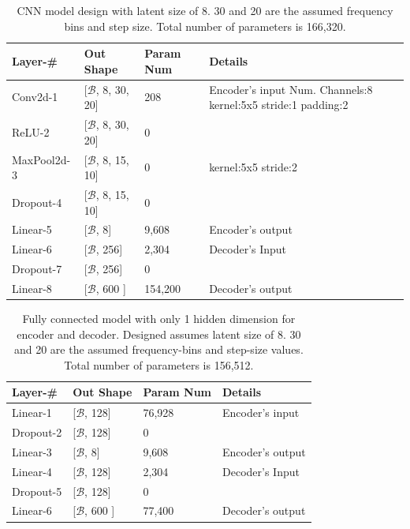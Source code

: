 \documentclass[\main/thesis.tex]{subfiles}
\begin{document}
\begin{table}[h]
\begin{tabular}{|p{28mm}|p{25mm}|p{23mm}|p{50mm}|}
\hline
Layer-\# & Out Shape & Param Num & Details  \\ \hline
Conv2d-1 & [$\mathcal{B}$, 8, 30, 20] &   208 & Encoder's input \newline
Num. Channels:8\newline
kernel:5x5\newline                  
stride:1\newline    
padding:2 \\ \hline
ReLU-2 & [$\mathcal{B}$, 8, 30, 20] &   0 & \\  \hline
MaxPool2d-3 & [$\mathcal{B}$, 8, 15, 10] & 0 &  kernel:5x5 \newline
stride:2 \\ \hline
Dropout-4 & [$\mathcal{B}$, 8, 15, 10] & 0 &  \\ \hline
Linear-5 & [$\mathcal{B}$, 8] & 9,608 & Encoder's output \\ \hline
Linear-6 & [$\mathcal{B}$, 256] & 2,304 & Decoder's Input \\ \hline
Dropout-7 & [$\mathcal{B}$, 256] & 0 &  \\ \hline
Linear-8 & [$\mathcal{B}$, 600 ] &  154,200& Decoder's output\\ \hline
\end{tabular}
\caption{CNN model design with latent size of 8. 30 and 20 are the assumed frequency bins and step size. Total number of parameters is 166,320. }
\label{table:CNNAUTOENCODER}
\end{table}

\begin{table}[h]
\begin{tabular}{|p{28mm}|p{25mm}|p{23mm}|p{50mm}|}
\hline
Layer-\# & Out Shape & Param Num & Details  \\ \hline
Linear-1 & [$\mathcal{B}$, 128]  & 76,928 & Encoder's input \\ \hline
Dropout-2 & [$\mathcal{B}$, 128] & 0 &  \\ \hline
Linear-3 & [$\mathcal{B}$, 8] & 9,608 & Encoder's output \\ \hline
Linear-4 & [$\mathcal{B}$, 128] & 2,304 & Decoder's Input \\ \hline
Dropout-5 & [$\mathcal{B}$, 128]  & 0 &  \\ \hline
Linear-6  & [$\mathcal{B}$, 600 ] &  77,400 &Decoder's output\\ \hline
\end{tabular}
\caption{Fully connected model with only 1 hidden dimension for encoder and decoder. Designed assumes latent size of 8. 30 and 20 are the assumed frequency-bins and step-size values. Total number of parameters is 156,512.}
\label{table:FC1_AUTOENCODER}
\end{table}
\end{document}
